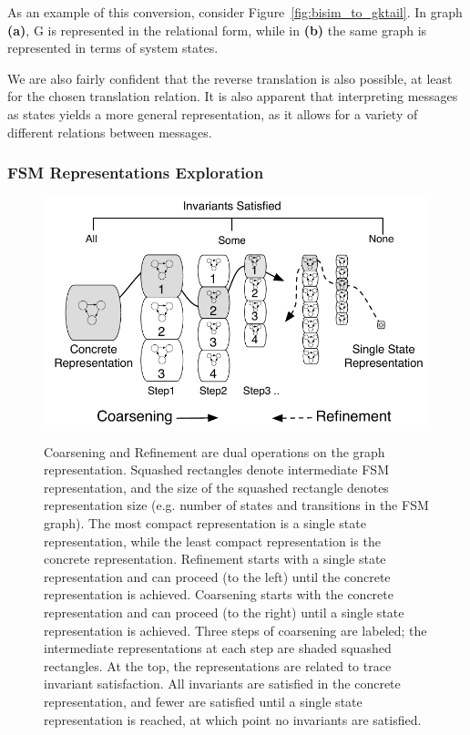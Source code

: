 As an example of this conversion, consider
Figure~\ref{fig:bisim_to_gktail}. In graph \textbf{(a)}, G is
represented in the relational form, while in \textbf{(b)} the same
graph is represented in terms of system states.


We are also fairly confident that the reverse translation is also
possible, at least for the chosen translation relation. It is also
apparent that interpreting messages as states yields a more general
representation, as it allows for a variety of different relations
between messages.


\subsubsection{FSM Representations Exploration}

\begin{figure}[t]
  \center
  {\includegraphics[width=\columnwidth]{img/refine_coarsen.pdf}}
  \caption{Coarsening and Refinement are dual operations on the graph
    representation. Squashed rectangles denote intermediate FSM
    representation, and the size of the squashed rectangle denotes
    representation size (e.g. number of states and transitions in the
    FSM graph). The most compact representation is a single state
    representation, while the least compact representation is the
    concrete representation. Refinement starts with a single state
    representation and can proceed (to the left) until the concrete
    representation is achieved. Coarsening starts with the concrete
    representation and can proceed (to the right) until a single state
    representation is achieved. Three steps of coarsening are labeled;
    the intermediate representations at each step are shaded squashed
    rectangles. At the top, the representations are related to trace
    invariant satisfaction. All invariants are satisfied in the
    concrete representation, and fewer are satisfied until a single
    state representation is reached, at which point no invariants are
    satisfied.}
 \label{fig:refine_coarsen}
\end{figure}


